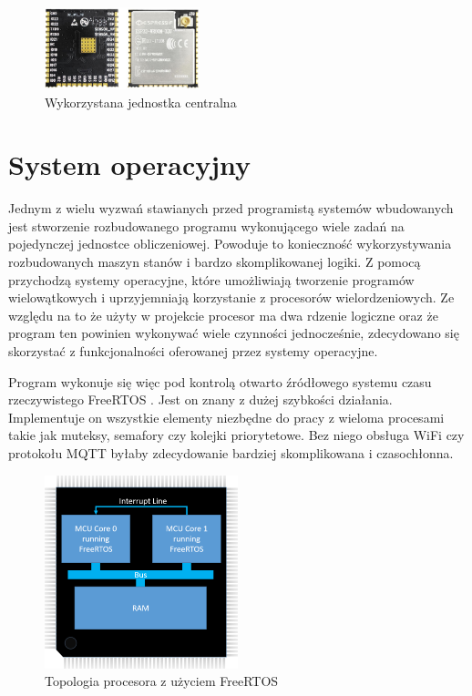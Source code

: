     
            \begin{figure}[ht]
              \centering
              \includegraphics[width=0.4\textwidth]{img/esp32.jpg}
              \caption{Wykorzystana jednostka centralna}
              \label{esp}
            \end{figure}
    
    
        \section{System operacyjny}
            Jednym z wielu wyzwań stawianych przed programistą systemów wbudowanych jest stworzenie rozbudowanego programu wykonującego wiele zadań na pojedynczej jednostce obliczeniowej. Powoduje to konieczność wykorzystywania rozbudowanych maszyn stanów i bardzo skomplikowanej logiki. Z pomocą przychodzą systemy operacyjne, które umożliwiają tworzenie programów wielowątkowych i uprzyjemniają korzystanie z procesorów wielordzeniowych. Ze względu na to że użyty w projekcie procesor ma dwa rdzenie logiczne oraz że program ten powinien wykonywać wiele czynności jednocześnie, zdecydowano się skorzystać z funkcjonalności oferowanej przez systemy operacyjne. 
            
            Program wykonuje się więc pod kontrolą otwarto źródłowego systemu czasu rzeczywistego FreeRTOS \cite{freertos}. Jest on znany z dużej szybkości działania. Implementuje on wszystkie elementy niezbędne do pracy z wieloma procesami takie jak muteksy, semafory czy kolejki priorytetowe. Bez niego obsługa WiFi czy protokołu MQTT byłaby zdecydowanie bardziej skomplikowana i czasochłonna. 
            
            \vspace{1em}
            
            \begin{figure}[ht]
              \centering
              \includegraphics[width=0.5\textwidth]{img/multicore_amp_hardware_configuration.png}
              \caption{Topologia procesora z użyciem FreeRTOS}
              \label{freertos}
            \end{figure}
            
